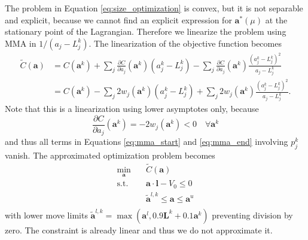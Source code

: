The problem in Equation \eqref{eq:size_optimization} is convex, but it is not separable and explicit, because we cannot find an explicit expression for $\mathbf{a}^*(\mu)$ at the stationary point of the Lagrangian. Therefore we linearize the problem using MMA in $1/(a_j-L_j^k)$. The linearization of the objective function becomes
\begin{align}
    \tilde{C}(\mathbf{a}) &= C(\mathbf{a}^k) + \sum_j \frac{\partial C}{\partial a_j}(\mathbf{a}^k) (a^k_j-L^k_j) - \sum_j \frac{\partial C}{\partial a_j}(\mathbf{a}^k) \frac{(a^k_j-L^k_j)^2}{a_j-L^k_j}\\
    &=C(\mathbf{a}^k) 
    - \sum_j 2w_j (\mathbf{a}^k) (a^k_j-L^k_j)
    + \sum_j 2w_j (\mathbf{a}^k)
    \frac{(a^k_j-L^k_j)^2}{a_j-L^k_j}.
\end{align}
Note that this is a linearization using lower asymptotes only, because 
\begin{equation}
    \frac{\partial C }{\partial a_j}(\mathbf{a}^k)  = - 2 w_j (\mathbf{a}^k) < 0 \quad \forall \mathbf{a}^k
\end{equation} 
and thus all terms in Equations \eqref{eq:mma_start} and \eqref{eq:mma_end} involving $p_j^k$ vanish.
The approximated optimization problem becomes 
\begin{equation}
    \begin{aligned}
        \min_{\mathbf{a}} \quad & \tilde{C} (\mathbf{a})\\
        \textrm{s.t.} \quad & \mathbf{a} \cdot \mathbf{l} - V_0 \le 0  \\
                            & \tilde{\mathbf{a}}^{l,k} \le \mathbf{a} \le \mathbf{a}^u\\
    \end{aligned}
\end{equation}
with lower move limits $\tilde{\mathbf{a}}^{l,k} = \max(\mathbf{a}^l,  0.9 \mathbf{L}^k + 0.1 \mathbf{a}^k)$ preventing division by zero. The constraint is already linear and thus we do not approximate it.

